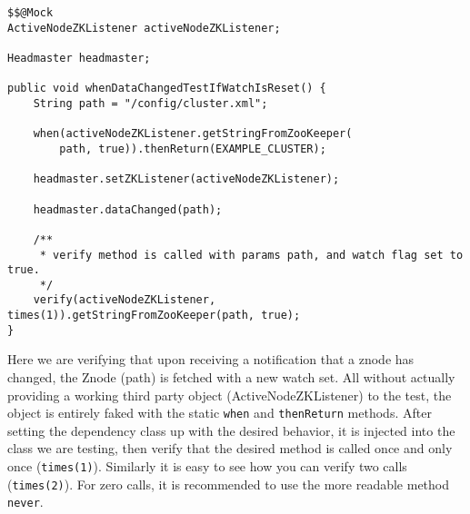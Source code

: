 \begin{lstlisting}[style=customjava,label=lst:mockito,caption={Test code utilizing Mockito. Think of the \texttt{@Mock} class as a subclass with all methods overrided \texttt{return null;}.}]
$$@Mock
ActiveNodeZKListener activeNodeZKListener;

Headmaster headmaster;

public void whenDataChangedTestIfWatchIsReset() {
    String path = "/config/cluster.xml";

    when(activeNodeZKListener.getStringFromZooKeeper(
    	path, true)).thenReturn(EXAMPLE_CLUSTER);

    headmaster.setZKListener(activeNodeZKListener);

    headmaster.dataChanged(path);

    /** 
     * verify method is called with params path, and watch flag set to true.
     */
    verify(activeNodeZKListener, times(1)).getStringFromZooKeeper(path, true);
}

\end{lstlisting}

Here we are verifying that upon receiving a notification that a znode has changed, the Znode (path) is fetched with a new watch set.
All without actually providing a working third party object (ActiveNodeZKListener) to the test, the object is entirely faked with the static \texttt{when} and \texttt{thenReturn} methods. After setting the dependency class up with the desired behavior, it is injected into the class we are testing, then verify that the desired method is called once and only once (\texttt{times(1)}). Similarly it is easy to see how you can verify two calls (\texttt{times(2)}). For zero calls, it is recommended to use the more readable method \texttt{never}.
